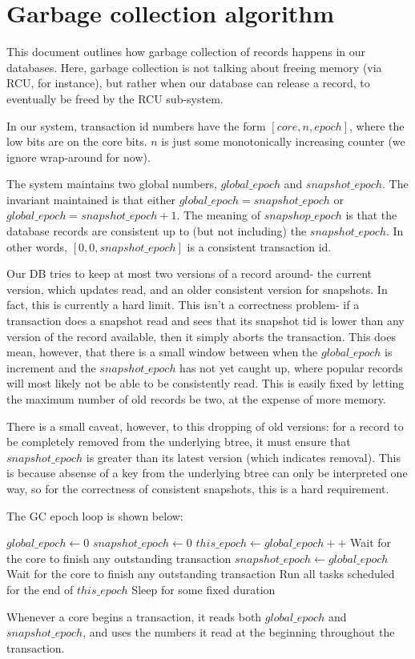 \documentclass[10pt]{article}
\begin{document}
\section*{Garbage collection algorithm}
This document outlines how garbage collection of records happens in our
databases. Here, garbage collection is not talking about freeing memory (via
RCU, for instance), but rather when our database can release a record, to
eventually be freed by the RCU sub-system.

In our system, transaction id numbers have the form $[core, n, epoch]$, where
the low bits are on the core bits. $n$ is just some monotonically increasing
counter (we ignore wrap-around for now). 

The system maintains two global numbers, $global\_epoch$ and $snapshot\_epoch$.
The invariant maintained is that either $global\_epoch = snapshot\_epoch$ or
$global\_epoch = snapshot\_epoch + 1$. The meaning of $snapshop\_epoch$ is that
the database records are consistent up to (but not including) the $snapshot\_epoch$.
In other words, $[0, 0, snapshot\_epoch]$ is a consistent transaction id.

Our DB tries to keep at most two versions of a record around- the current
version, which updates read, and an older consistent version for snapshots.  In
fact, this is currently a hard limit. This isn't a correctness problem- if a
transaction does a snapshot read and sees that its snapshot tid is lower than
any version of the record available, then it simply aborts the transaction.
This does mean, however, that there is a small window between when the
$global\_epoch$ is increment and the $snapshot\_epoch$ has not yet caught up,
where popular records will most likely not be able to be consistently read.
This is easily fixed by letting the maximum number of old records be two, at
the expense of more memory.

There is a small caveat, however, to this dropping of old versions: for a
record to be completely removed from the underlying btree, it must ensure that
$snapshot\_epoch$ is greater than its latest version (which indicates removal).
This is because absense of a key from the underlying btree can only be
interpreted one way, so for the correctness of consistent snapshots, this is a
hard requirement.

The GC epoch loop is shown below:
\begin{algorithm}
  \LinesNumbered
  \DontPrintSemicolon
  $global\_epoch \leftarrow 0$\;
  $snapshot\_epoch \leftarrow 0$\;
   {
    $this\_epoch \leftarrow global\_epoch++$\;
     {
      Wait for the core to finish any outstanding transaction\;
    }
    $snapshot\_epoch \leftarrow global\_epoch$\;
     {
      Wait for the core to finish any outstanding transaction\;
    }
    Run all tasks scheduled for the end of $this\_epoch$\;
    Sleep for some fixed duration\;
  }
\end{algorithm}
Whenever a core begins a transaction, it reads both $global\_epoch$ and
$snapshot\_epoch$, and uses the numbers it read at the beginning throughout the
transaction.
\end{document}
